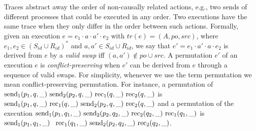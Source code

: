 Traces abstract away the order of non-causally related actions, e.g., two sends of different processes that could be executed in any order. 
%
Two executions have the same trace when they only differ in the order between such actions.
Formally, given an execution $e=e_1\cdot a\cdot a'\cdot e_2$ with $tr(e)=(A,po,src)$, where $e_1, e_2\in (S_{id}\cup R_{id})^*$ and $a,a'\in S_{id}\cup R_{id}$, we say that $e'=e_1\cdot a'\cdot a\cdot e_2$ is derived from $e$ by a \emph{valid swap} iff $(a,a')\not\in po\cup src$. A permutation $e'$ of an execution $e$ is \emph{conflict-preserving} when $e'$ can be derived from $e$ through a sequence of valid swaps. 
For simplicity, whenever we use the term permutation we mean conflict-preserving permutation.
For instance, a permutation of 
$\send{1}{p_1,q,\_}\ 
\send{2}{p_2,q,\_}\ 
\rec{1}{q,\_}\ 
\rec{2}{q,\_}$
is 
$\send{1}{p_1,q,\_}\ 
\rec{1}{q,\_}\ 
\send{2}{p_2,q,\_}\ 
\rec{2}{q,\_}$
and a permutation of the execution
$\send{1}{p_1,q_1,\_}\ 
\send{2}{p_2,q_2,\_}\ 
\rec{2}{q_2,\_}\ 
\rec{1}{q_1,\_} $
is
$\mathrm{send}_{1}({p_1,q_1,\_})\ $
$\rec{1}{q_1,\_}\ 
\send{2}{p_2,q_2,\_}\ 
\rec{2}{q_2,\_}$.



